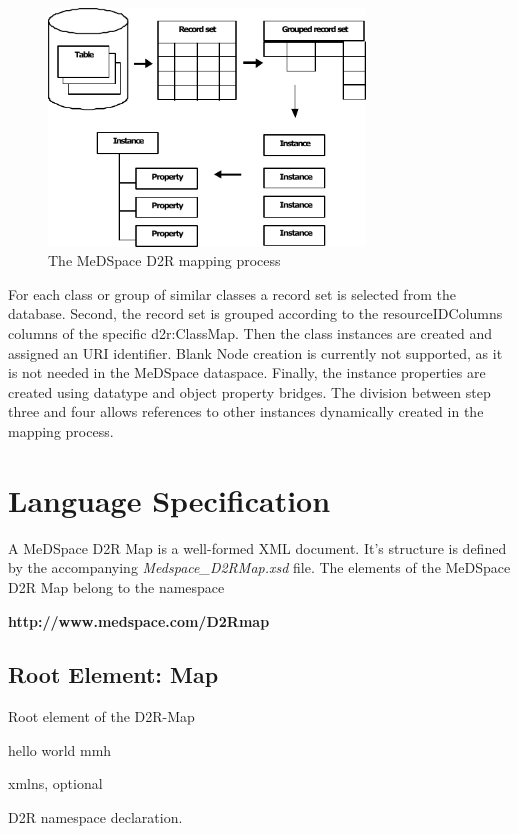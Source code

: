 \begin{figure}[H]
	\begin{center}
		\includegraphics [width=0.75\textwidth]{../images/MappingProcess.pdf}
	\end{center}
	\caption{The MeDSpace D2R mapping process}
	\label{MappingProcessFigure}
\end{figure}

For each class or group of similar classes a record set is selected from the
database. Second, the record set is grouped according to the resourceIDColumns columns of
the specific d2r:ClassMap. Then the class instances are created and assigned an URI identifier. Blank Node creation is currently not supported, as it is not needed in the MeDSpace dataspace. Finally, the instance properties are created using
datatype and object property bridges.
The division between step three and four allows references to other instances dynamically created in the mapping process.

\chapter{Language Specification}

A MeDSpace D2R Map is a well-formed XML document. It's structure is defined by the accompanying \textit{Medspace\_D2RMap.xsd} file. The elements of the MeDSpace D2R Map belong to the namespace
\begin{center}
	\textbf{http://www.medspace.com/D2Rmap}
\end{center}

\section{Root Element: Map}
\docunit[Description]
Root element of the D2R-Map


hello world
mmh
\enddocunit

\docunit[Attributes:]
xmlns, optional

D2R namespace declaration.
\enddocunit